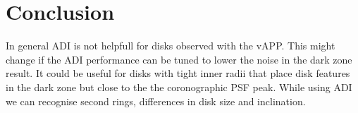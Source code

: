 \section{Conclusion}
In general \ac{ADI} is not helpfull for disks observed with the \ac{vAPP}. This might change if the \ac{ADI} performance can be tuned to lower the noise in the dark zone result. It could be useful for disks with tight inner radii that place disk features in the dark zone but close to the the coronographic \ac{PSF} peak. While using \ac{ADI} we can recognise second rings, differences in disk size and inclination. 

